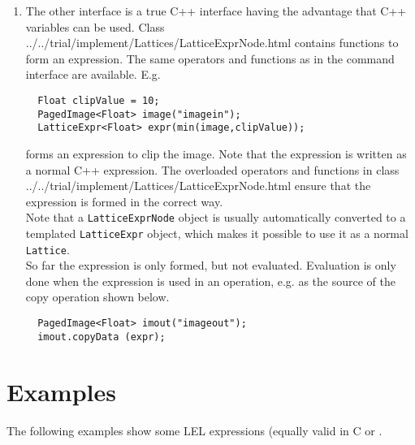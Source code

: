 \begin{itemize}
\begin{enumerate}
  \item
    The other interface is a true C++ interface having the
    advantage that C++ variables can be used. Class
    {../../trial/implement/Lattices/LatticeExprNode.html}
    contains functions to form an expression. The same operators
    and functions as in the command interface are available.
    E.g.
\begin{verbatim}
  Float clipValue = 10;
  PagedImage<Float> image("imagein");
  LatticeExpr<Float> expr(min(image,clipValue));
\end{verbatim}
    forms an expression to clip the image. Note that the expression is
    written as a normal C++ expression. The overloaded operators and
    functions in class 
    {../../trial/implement/Lattices/LatticeExprNode.html}
    ensure that the expression is formed in the correct way.
    \\Note that a \texttt{LatticeExprNode} object is usually
    automatically converted to a templated \texttt{LatticeExpr} object,
    which makes it possible to use it as a normal \texttt{Lattice}.
    \\So far the expression is only formed, but not evaluated.
    Evaluation is only done when the expression is used in an
    operation, e.g. as the source of the copy operation shown below.
\begin{verbatim}
  PagedImage<Float> imout("imageout");
  imout.copyData (expr);
\end{verbatim}

  \end{enumerate}

\end{itemize}

\section{\label{LEL:EXAMPLES}{Examples}}
The following examples show some LEL expressions (equally valid 
in C\+\+ or \Glish.

